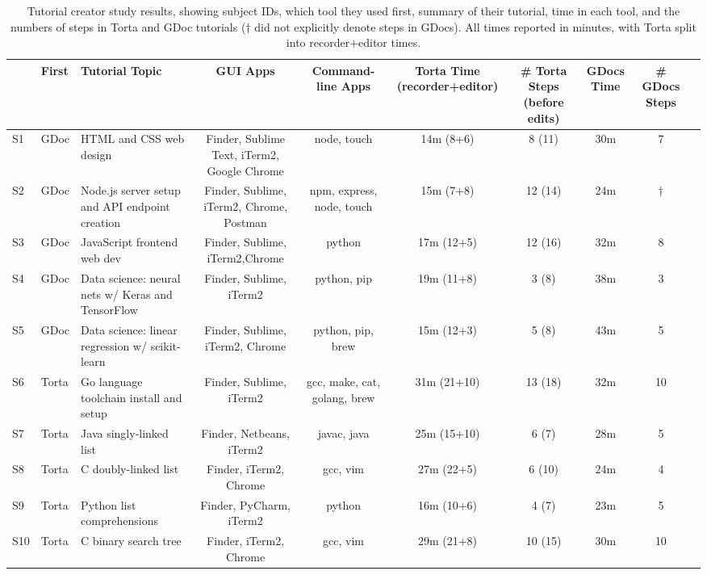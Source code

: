 \begin{table*}[h]
\small
\centering
\begin{tabulary}{\textwidth}{@{}LLLCCCCCCC@{}}
& First & Tutorial Topic & GUI Apps & Command-line Apps & Torta Time (recorder+editor) & \# Torta Steps (before edits) & GDocs Time & \# GDocs Steps \\
\hline
S1  & GDoc & HTML and CSS web design & Finder, Sublime Text, iTerm2, Google Chrome & node, touch & 14m (8+6) & 8 (11) & 30m & 7 \\
\hline
S2  & GDoc & Node.js server setup and API endpoint creation & Finder, Sublime, iTerm2, Chrome, Postman & npm, express, node, touch & 15m (7+8) & 12 (14) & 24m & $\dagger$ \\
\hline
S3  & GDoc & JavaScript frontend web dev & Finder, Sublime, iTerm2,Chrome & python & 17m (12+5) & 12 (16) & 32m & 8 \\
\hline
S4  & GDoc & Data science: neural nets w/ Keras and TensorFlow & Finder, Sublime, iTerm2 & python, pip & 19m (11+8) & 3 (8) & 38m & 3 \\
\hline
S5  & GDoc & Data science: linear regression w/ scikit-learn & Finder, Sublime, iTerm2, Chrome & python, pip, brew & 15m (12+3) & 5 (8) & 43m & 5 \\
\hline
S6  & Torta & Go language toolchain install and setup & Finder, Sublime, iTerm2 & gcc, make, cat, golang, brew & 31m (21+10) & 13 (18) & 32m & 10 \\
\hline
S7  & Torta & Java singly-linked list & Finder, Netbeans, iTerm2 & javac, java & 25m (15+10) & 6 (7) & 28m & 5 \\
\hline
S8  & Torta & C doubly-linked list & Finder, iTerm2, Chrome & gcc, vim & 27m (22+5) & 6 (10) & 24m & 4 \\
\hline
S9  & Torta & Python list comprehensions & Finder, PyCharm, iTerm2 & python & 16m (10+6) & 4 (7) & 23m & 5 \\
\hline
S10 & Torta & C binary search tree & Finder, iTerm2, Chrome & gcc, vim & 29m (21+8) & 10 (15) & 30m & 10 \\

\end{tabulary}

\caption{Tutorial creator study results, showing subject IDs, which tool they used first, summary of their tutorial, time in each tool, and the numbers of steps in Torta and GDoc tutorials ($\dagger$ did not explicitly denote steps in GDocs). All times reported in minutes, with Torta split into recorder+editor times.}

\vspace{-1em} %
\label{tab:creator-study}
\end{table*}

